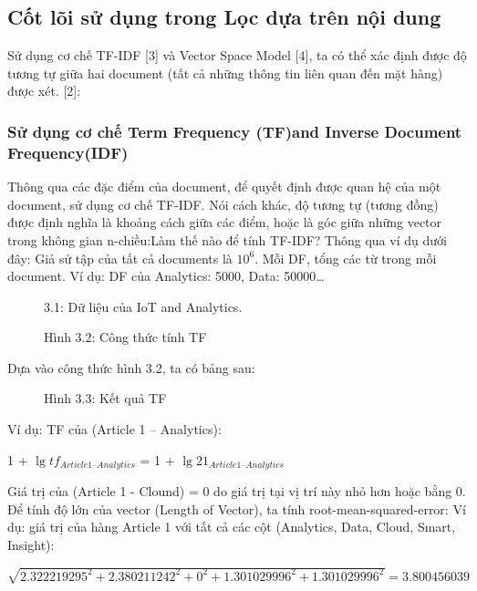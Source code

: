\documentclass[a4paper,12pt,numbered,print,index,custombib, oneside, custommargin]{report}
\begin{document}
\subsection{Cốt lõi sử dụng trong Lọc dựa trên nội dung}
Sử dụng cơ chế TF-IDF [3] và Vector Space Model [4], ta có thể xác định được độ tương tự giữa hai document (tất cả những thông tin liên quan đến mặt hàng) được xét. [2]:
\subsubsection{Sử dụng cơ chế Term Frequency (TF)and Inverse Document Frequency(IDF)}
Thông qua các đặc điểm của document, để quyết định được quan hệ của một document, sử dụng cơ chế TF-IDF. Nói cách khác, độ tương tự (tương đồng) được định nghĩa là khoảng cách giữa các điểm, hoặc là góc giữa những vector trong không gian n-chiều:Làm thế nào để tính TF-IDF? Thông qua ví dụ dưới đây: Giả sử tập của tất cả documents là $10^6$. Mỗi DF, tổng các từ trong mỗi document. Ví dụ: DF của Analytics: 5000, Data: 50000…

\begin{figure}[h]
\centering
\caption{3.1: Dữ liệu của IoT and Analytics.}
\end{figure}

\begin{figure}[h]
\centering
\caption{Hình 3.2: Công thức tính TF}
\end{figure}

Dựa vào công thức hình 3.2, ta có bảng sau:
\begin{figure}[h]
\centering
\caption{Hình 3.3: Kết quả TF}
\end{figure}

Ví dụ: TF của (Article 1 – Analytics): \par
1 + $\lg tf _{Article 1– Analytics}$ = 1 + $\lg 21 _{Article 1– Analytics}$ \par

Giá trị của (Article 1 - Clound) = 0 do giá trị tại vị trí này nhỏ hơn hoặc bằng 0.
Để tính độ lớn của vector (Length of Vector), ta tính root-mean-squared-error:
Ví dụ: giá trị của hàng Article 1 với tất cả các cột (Analytics, Data, Cloud, Smart, Insight):\par
$\sqrt{2.322219295^2 + 2.380211242^2 + 0^2 + 1.301029996^2 + 1.301029996^2} = 3.800456039$ \par
\end{document}
